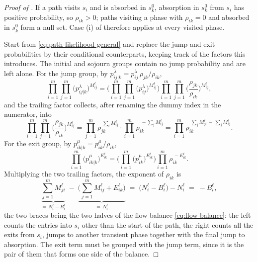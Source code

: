 \documentclass{article}
\begin{document}
\begin{proof}[Proof of ]
If a path visits $s_i$ and is absorbed in $s^0_k$, absorption in $s^0_k$ from $s_i$ has positive
probability, so $\rho_{ik}>0$; paths visiting a phase with $\rho_{ik}=0$ and absorbed in $s^0_k$ form
a null set. Case \textup{(i)} of  therefore applies at every visited phase.

Start from \eqref{eq:path-likelihood-general} and replace the jump and exit
probabilities by their conditional counterparts, keeping track of the factors this introduces. The
initial and sojourn groups contain no jump probability and are left alone. For the jump group, by
$p^\lambda_{ij|k}=p^\lambda_{ij}\,\rho_{jk}/\rho_{ik}$,
%
\[
\prod_{i=1}^m\prod_{j=1}^m \big(p^\lambda_{ij|k}\big)^{M^\ell_{ij}}
=
\Big( \prod_{i=1}^m\prod_{j=1}^m \big(p^\lambda_{ij}\big)^{M^\ell_{ij}} \Big)
\prod_{i=1}^m\prod_{j=1}^m \Big( \frac{\rho_{jk}}{\rho_{ik}} \Big)^{M^\ell_{ij}} ,
\]
%
and the trailing factor collects, after renaming the dummy index in the numerator, into
%
\[
\prod_{i=1}^m\prod_{j=1}^m \Big( \frac{\rho_{jk}}{\rho_{ik}} \Big)^{M^\ell_{ij}}
=
\prod_{j=1}^m \rho_{jk}^{\;\sum_{i} M^\ell_{ij}}
\cdot
\prod_{i=1}^m \rho_{ik}^{\;-\sum_{j} M^\ell_{ij}}
=
\prod_{i=1}^m \rho_{ik}^{\;\sum_{j} M^\ell_{ji} \,-\, \sum_{j} M^\ell_{ij}} .
\]
%
For the exit group, by $p^\mu_{ik|k}=p^\mu_{ik}/\rho_{ik}$,
%
\[
\prod_{i=1}^m \big(p^\mu_{ik|k}\big)^{E^\ell_{ik}}
=
\Big( \prod_{i=1}^m \big(p^\mu_{ik}\big)^{E^\ell_{ik}} \Big)
\prod_{i=1}^m \rho_{ik}^{\,-E^\ell_{ik}} .
\]
%
Multiplying the two trailing factors, the exponent of $\rho_{ik}$ is
%
\[
\underbrace{\sum_{j=1}^m M^\ell_{ji}}_{=\,N^\ell_i - B^\ell_i}
\;-\;
\underbrace{\Big( \sum_{j=1}^m M^\ell_{ij} + E^\ell_{ik} \Big)}_{=\,N^\ell_i}
\;=\;
\big( N^\ell_i - B^\ell_i \big) - N^\ell_i
\;=\;
- B^\ell_i ,
\]
%
the two braces being the two halves of the flow balance \eqref{eq:flow-balance}: the left counts the
entries into $s_i$ other than the start of the path, the right counts all the exits from $s_i$, jumps
to another transient phase together with the final jump to absorption. The exit term must be grouped
with the jump term, since it is the pair of them that forms one side of the balance.


\end{proof}
\end{document}
